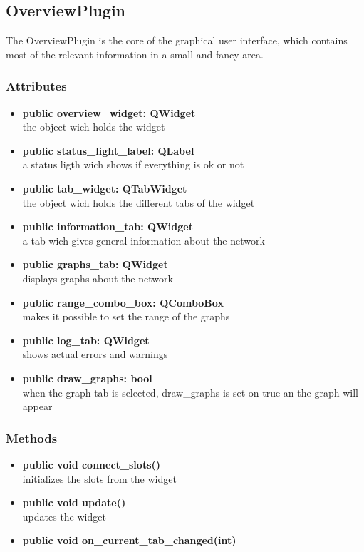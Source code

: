 \subsection{OverviewPlugin}
The OverviewPlugin is the core of the graphical user interface, which
contains most of the relevant information in a small and fancy area.
\subsubsection{Attributes}
\begin{itemize}
  \item \textbf{public overview\_widget: QWidget}\\
  the object wich holds the widget
  \item \textbf{public status\_light\_label: QLabel}\\
  a status ligth wich shows if everything is ok or not
  \item \textbf{public tab\_widget: QTabWidget}\\
  the object wich holds the different tabs of the widget
  \item \textbf{public information\_tab: QWidget}\\
  a tab wich gives general information about the network 
  \item \textbf{public graphs\_tab: QWidget}\\
  displays graphs about the network
  \item \textbf{public range\_combo\_box: QComboBox}\\
  makes it possible to set the range of the graphs
  \item \textbf{public log\_tab: QWidget}\\
  shows actual errors and warnings
  \item \textbf{public draw\_graphs: bool}\\
  when the graph tab is selected, draw\_graphs is set on true an the graph will
  appear
\end{itemize}
\subsubsection{Methods}
\begin{itemize}
  \item \textbf{public void connect\_slots()}\\
  initializes the slots from the widget
  \item \textbf{public void update()}\\
  updates the widget
  \item \textbf{public void on\_current\_tab\_changed(int)}\\
  
\end{itemize}

